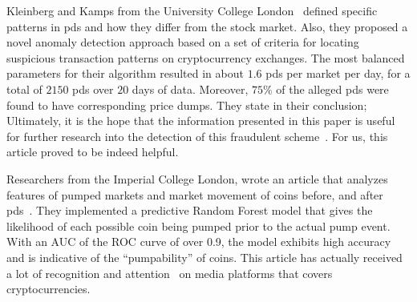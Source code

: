 
Kleinberg and Kamps from the University College London~\cite{P&D_to_the_moon} defined specific patterns in \acp{pd} and how they differ from the stock market. Also, they proposed a novel anomaly detection approach based on a set of criteria for locating suspicious transaction patterns on cryptocurrency exchanges. The most balanced parameters for their algorithm resulted in about $1.6$ \acp{pd} per market per day, for a total of $2150$ \acp{pd} over $20$ days of data. Moreover, $75\%$ of the alleged \acp{pd} were found to have corresponding price dumps. They state in their conclusion; Ultimately, it is the hope that the information presented in this paper is useful for further research into the detection of this fraudulent scheme~\cite{P&D_to_the_moon}. For us, this article proved to be indeed helpful.

Researchers from the Imperial College London, wrote an article that analyzes features of pumped markets and market movement of coins before, and after \acp{pd}~\cite{P&D_anatomy}. They implemented a predictive Random Forest model that gives the likelihood of each possible coin being pumped prior to the actual pump event. With an AUC of the ROC curve of over 0.9, the model exhibits high accuracy and is indicative of the “pumpability” of coins. This article has actually received a lot of recognition and attention~\cite{P&D_MIT_crypto, P&D_cointelegraph, P&D_UTB} on media platforms that covers cryptocurrencies.
